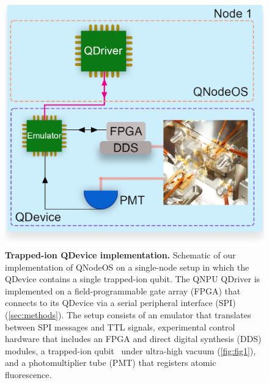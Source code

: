 \begin{figure}[htb]
\centering
\includegraphics[width=1\linewidth]{figures/qnodeos/main/fig5/fig5.png}
\caption{\textbf{Trapped-ion QDevice implementation.} Schematic of our implementation of QNodeOS on a single-node setup in which the QDevice contains a single trapped-ion qubit. The QNPU QDriver is implemented on a field-programmable gate array (FPGA) that connects to its QDevice via a serial peripheral interface (SPI) (\cref{sec:methods}). The setup consists of an emulator that translates between SPI messages and TTL signals, experimental control hardware that includes an FPGA and direct digital synthesis (DDS) modules, a trapped-ion qubit~\cite{teller2023integrating} under ultra-high vacuum (\cref{fig:fig1}), and a photomultiplier tube (PMT) that registers atomic fluorescence.}
\label{fig:fig5}
\end{figure}